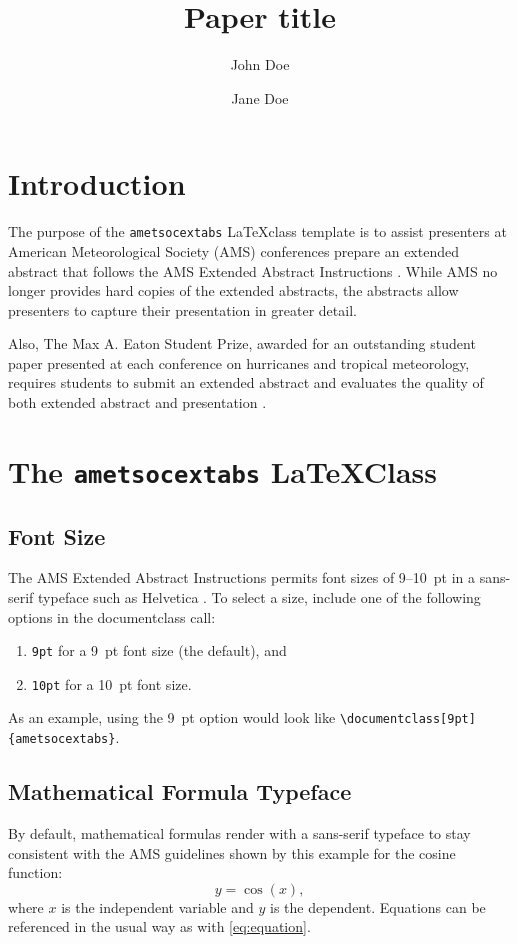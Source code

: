 \documentclass[9pt]{ametsocextabs}
\title{Paper title}
\author{John Doe\aff{a}\correspondingauthor{John Doe, Street Address, City, AB ZIP code;
        e-mail: \href{mailto:}{John.Doe@affiliation.domain}}
        \and Jane Doe\aff{b}
}
\affiliation{\aff{a}{Affiliation},
             \aff{b}{Affiliation}}
\begin{document}
\maketitle
\section{Introduction}
The purpose of the \lowercase{\texttt{ametsocextabs}} \LaTeX class
template is to assist presenters at American Meteorological Society
(AMS) conferences prepare an extended abstract that follows the AMS
Extended Abstract Instructions \citep{AMS2025abs}. While AMS no
longer provides hard copies of the extended abstracts, the abstracts
allow presenters to capture their presentation in greater detail.

Also, The Max A. Eaton Student Prize, awarded for an outstanding
student paper presented at each conference on hurricanes and tropical
meteorology, requires students to submit an extended abstract and
evaluates the quality of both extended abstract and presentation
\citep{AMS2025student, AMS2025Eaton}.

\section{The \lowercase{\texttt{ametsocextabs}} \LaTeX Class}

\subsection{Font Size}

The AMS Extended Abstract Instructions permits font sizes of 9--10~pt
in a sans-serif typeface such as Helvetica \citep{AMS2025abs}.
To select a size, include one of the following options in the
documentclass call:
\begin{enumerate}
    \item \texttt{9pt} for a 9~pt font size (the default), and
    \item \texttt{10pt} for a 10~pt font size.
\end{enumerate}
As an example, using the 9~pt option would look like
\texttt{\textbackslash documentclass[9pt]\{ametsocextabs\}}.

\subsection{Mathematical Formula Typeface}
By default, mathematical formulas render with a sans-serif typeface
to stay consistent with the AMS guidelines shown by this example
for the cosine function:
\begin{equation}
    y = \cos (x),
    \label{eq:equation}
\end{equation}
where $x$ is the independent variable and $y$ is the dependent.
Equations can be referenced in the usual way as with \eqref{eq:equation}.
\end{document}
